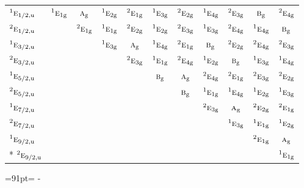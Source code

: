 \documentclass[10pt,a4paper]{article}
\newcommand{\needspace}[1]{\par\penalty-100\begingroup\dimen0=#1\relax\dimen2=\pagegoal
  \advance\dimen2-\pagetotal\ifdim\dimen0>\dimen2\relax\ifdim\dimen2>0pt\vfil\break\fi\fi
  \endgroup}
\numberwithin{equation}{section}
\newcommand{\irr}[1]{\text{\normalfont\scshape #1}}
\newcommand{\conjpair}[1]{{}^{#1}}
\newcommand{\ptag}[1]{\mathrm{#1}}
\begin{document}
{\begin{longtable}{@{}lcccccccccc@{}}
$\conjpair{1}\irr{e}_{1/2,\ptag{u}}$ & $\conjpair{1}\irr{e}_{1\ptag{g}}$ & $\irr{a}_{\ptag{g}}$ & $\conjpair{1}\irr{e}_{2\ptag{g}}$ & $\conjpair{2}\irr{e}_{1\ptag{g}}$ & $\conjpair{1}\irr{e}_{3\ptag{g}}$ & $\conjpair{2}\irr{e}_{2\ptag{g}}$ & $\conjpair{1}\irr{e}_{4\ptag{g}}$ & $\conjpair{2}\irr{e}_{3\ptag{g}}$ & $\irr{b}_{\ptag{g}}$ & $\conjpair{2}\irr{e}_{4\ptag{g}}$\\
$\conjpair{2}\irr{e}_{1/2,\ptag{u}}$ &  & $\conjpair{2}\irr{e}_{1\ptag{g}}$ & $\conjpair{1}\irr{e}_{1\ptag{g}}$ & $\conjpair{2}\irr{e}_{2\ptag{g}}$ & $\conjpair{1}\irr{e}_{2\ptag{g}}$ & $\conjpair{2}\irr{e}_{3\ptag{g}}$ & $\conjpair{1}\irr{e}_{3\ptag{g}}$ & $\conjpair{2}\irr{e}_{4\ptag{g}}$ & $\conjpair{1}\irr{e}_{4\ptag{g}}$ & $\irr{b}_{\ptag{g}}$\\
$\conjpair{1}\irr{e}_{3/2,\ptag{u}}$ &  &  & $\conjpair{1}\irr{e}_{3\ptag{g}}$ & $\irr{a}_{\ptag{g}}$ & $\conjpair{1}\irr{e}_{4\ptag{g}}$ & $\conjpair{2}\irr{e}_{1\ptag{g}}$ & $\irr{b}_{\ptag{g}}$ & $\conjpair{2}\irr{e}_{2\ptag{g}}$ & $\conjpair{2}\irr{e}_{4\ptag{g}}$ & $\conjpair{2}\irr{e}_{3\ptag{g}}$\\
$\conjpair{2}\irr{e}_{3/2,\ptag{u}}$ &  &  &  & $\conjpair{2}\irr{e}_{3\ptag{g}}$ & $\conjpair{1}\irr{e}_{1\ptag{g}}$ & $\conjpair{2}\irr{e}_{4\ptag{g}}$ & $\conjpair{1}\irr{e}_{2\ptag{g}}$ & $\irr{b}_{\ptag{g}}$ & $\conjpair{1}\irr{e}_{3\ptag{g}}$ & $\conjpair{1}\irr{e}_{4\ptag{g}}$\\
$\conjpair{1}\irr{e}_{5/2,\ptag{u}}$ &  &  &  &  & $\irr{b}_{\ptag{g}}$ & $\irr{a}_{\ptag{g}}$ & $\conjpair{2}\irr{e}_{4\ptag{g}}$ & $\conjpair{2}\irr{e}_{1\ptag{g}}$ & $\conjpair{2}\irr{e}_{3\ptag{g}}$ & $\conjpair{2}\irr{e}_{2\ptag{g}}$\\
$\conjpair{2}\irr{e}_{5/2,\ptag{u}}$ &  &  &  &  &  & $\irr{b}_{\ptag{g}}$ & $\conjpair{1}\irr{e}_{1\ptag{g}}$ & $\conjpair{1}\irr{e}_{4\ptag{g}}$ & $\conjpair{1}\irr{e}_{2\ptag{g}}$ & $\conjpair{1}\irr{e}_{3\ptag{g}}$\\
$\conjpair{1}\irr{e}_{7/2,\ptag{u}}$ &  &  &  &  &  &  & $\conjpair{2}\irr{e}_{3\ptag{g}}$ & $\irr{a}_{\ptag{g}}$ & $\conjpair{2}\irr{e}_{2\ptag{g}}$ & $\conjpair{2}\irr{e}_{1\ptag{g}}$\\
$\conjpair{2}\irr{e}_{7/2,\ptag{u}}$ &  &  &  &  &  &  &  & $\conjpair{1}\irr{e}_{3\ptag{g}}$ & $\conjpair{1}\irr{e}_{1\ptag{g}}$ & $\conjpair{1}\irr{e}_{2\ptag{g}}$\\
$\conjpair{1}\irr{e}_{9/2,\ptag{u}}$ &  &  &  &  &  &  &  &  & $\conjpair{2}\irr{e}_{1\ptag{g}}$ & $\irr{a}_{\ptag{g}}$\\*
$\conjpair{2}\irr{e}_{9/2,\ptag{u}}$ &  &  &  &  &  &  &  &  &  & $\conjpair{1}\irr{e}_{1\ptag{g}}$\\
\bottomrule\end{longtable}}
\needspace{91pt}
\end{document}
